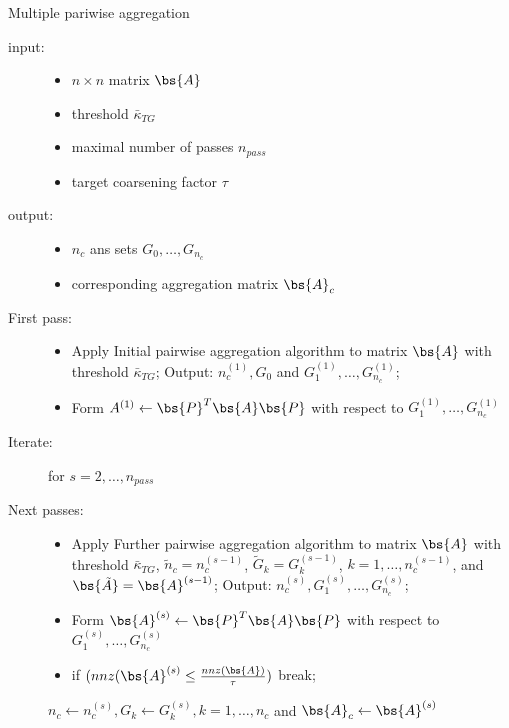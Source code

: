 \begin{algorithm}
Multiple pariwise aggregation\\
\begin{description}
\item [input:] \hbox{}
\begin{itemize}
\item[] $n\times n$ matrix $\bs{A}$
\item[] threshold $\bar{\kappa}_{TG}$
\item[] maximal number of passes $n_{pass}$
\item[] target coarsening factor $\tau$
\end{itemize}
\item [output:] \hbox{}
\begin{itemize}
\item $n_c$ ans sets $G_0,\hdots,G_{n_c}$
\item corresponding aggregation matrix $\bs{A}_c$
\end{itemize}
\end{description}
\begin{description}
\item[First pass:] \hbox{}
\begin{itemize}
\item[] Apply Initial pairwise aggregation algorithm  to matrix $\bs{A}$ with
threshold $\bar{\kappa}_{TG}$; Output: $n_c^{(1)}, G_0$ and
$G_1^{(1)},\hdots,G_{n_c}^{(1)}$;
\item[] Form $A^{(1)}\leftarrow \bs{P}^T \bs{A} \bs{P}$ with respect to
$G_1^{(1)},\hdots,G_{n_c}^{(1)}$
\end{itemize}
\item [Iterate:] for $s=2,\hdots,n_{pass}$
\item [Next passes:] \hbox{}
\begin{itemize}
\item[] Apply Further pairwise aggregation algorithm to matrix
$\bs{A}$ with threshold $\bar{\kappa}_{TG}$, $\tilde{n}_c=n_c^{(s-1)}$,
$\tilde{G}_k = G_k^{(s-1)}$, $k=1,\hdots,n_c^{(s-1)}$, and $\bs{\tilde{A}} =
\bs{A}^{(s-1)}$; Output: $n_c^{(s)}, G_1^{(s)},\hdots, G_{n_c}^{(s)}$;
\item[] Form $\bs{A}^{(s)}\leftarrow \bs{P}^T\bs{A}\bs{P}$ with respect to
$G_1^{(s)},\hdots,G_{n_c}^{(s)}$
\item[] if $(nnz(\bs{A}^{(s)}\leq \frac{nnz(\bs{A})}{\tau})$ break;
\end{itemize}
\item [] $n_c \leftarrow n_c^{(s)}, G_k \leftarrow G_k^{(s)}, k=1,\hdots, n_c$
and $\bs{A}_c \leftarrow \bs{A}^{(s)}$
\end{description}
\label{4_3}
\end{algorithm}

